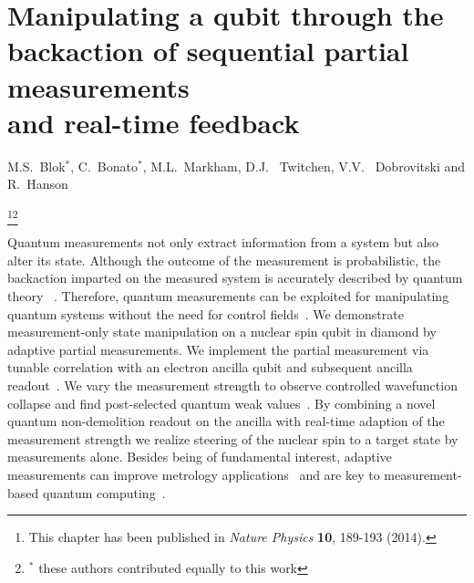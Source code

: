 \graphicspath{{./ch_adptv_msmnt_cntrl/figures/}}


\chapter[Manipulating a qubit through the backaction of adaptive measurements]{Manipulating a qubit through the backaction of sequential partial measurements \\ and real-time feedback }
\label{ch:AMC}

\begin{center} 
    \vspace{-1cm} {M.S.~Blok$^*$, C.~Bonato$^*$, M.L.~Markham, D.J. ~Twitchen, V.V. ~Dobrovitski and R.~Hanson} 
\end{center}


{\renewcommand{\thefootnote}{}\footnote{This chapter has been published in
    {\em Nature Physics} \textbf{10}, 189-193 (2014).}\footnote{$^*$ these authors contributed equally to this work}}


\vspace{-0.5cm} 
Quantum measurements not only extract information from a system but also alter its state. Although the outcome of the measurement is probabilistic, the backaction imparted on the measured system is accurately described by quantum theory ~\cite{Guerlin_Nature_2007,Hatridge_Science_2013,Murch_Nature_2013}. Therefore, quantum measurements can be exploited for manipulating quantum systems without the need for control fields~\cite{Ashhab_PhysRevA_2010,Wiseman_NatureNV_2011}. We demonstrate measurement-only state manipulation on a nuclear spin qubit in diamond by adaptive partial measurements. We implement the partial measurement via tunable correlation with an electron ancilla qubit and subsequent ancilla readout~\cite{Brun_PhysRevA_2008,Groen_PRL_2013}. We vary the measurement strength to observe controlled wavefunction collapse and find post-selected quantum weak values~\cite{Brun_PhysRevA_2008,Groen_PRL_2013,Aharonov_PRL_1988,Pryde_PRL_2005,Dressel_ArXiv_2013}. By combining a novel quantum non-demolition readout on the ancilla with real-time adaption of the measurement strength we realize steering of the nuclear spin to a target state by measurements alone. Besides being of fundamental interest, adaptive measurements can improve metrology applications~\cite{Cappellaro_PhysRevA_2012,Higgins_Nature_2007} and are key to measurement-based quantum computing~\cite{Raussendorf_PRL_2001,Prevedel_Nature_2007}.


\clearpage

